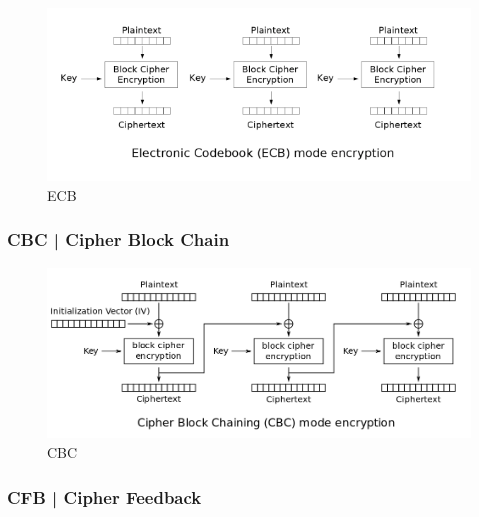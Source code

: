 \begin{figure}[H]
	\centering
	\includegraphics[width=.9\textwidth, height=.9\textheight, keepaspectratio]{./images/aes_modes/ecb_encryption.png} %
	\caption{ECB}
	\label{fig:ecb}
\end{figure}

\subsubsection{CBC | Cipher Block Chain}


\textsf{\small }

\begin{figure}[H]
	\centering
	\includegraphics[width=1\textwidth, height=1\textheight, keepaspectratio]{./images/aes_modes/cbc.png} %
	\caption{CBC}
	\label{fig:cbc}
\end{figure}


\subsubsection{CFB | Cipher Feedback}

